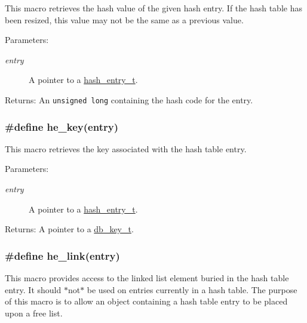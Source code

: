 This macro retrieves the hash value of the given hash entry. If the hash table has been resized, this value may not be the same as a previous value.

\begin{Desc}
\item[Parameters:]
\begin{description}
\item[{\em entry}]A pointer to a \hyperlink{group__dbprim__hash_a1}{hash\_\-entry\_\-t}.\end{description}
\end{Desc}
\begin{Desc}
\item[Returns:]An {\tt unsigned long} containing the hash code for the entry. \end{Desc}
\hypertarget{group__dbprim__hash_a35}{
\subsubsection[he\_\-key]{\setlength{\rightskip}{0pt plus 5cm}\#define he\_\-key(entry)}}
\label{group__dbprim__hash_a35}


This macro retrieves the key associated with the hash table entry.

\begin{Desc}
\item[Parameters:]
\begin{description}
\item[{\em entry}]A pointer to a \hyperlink{group__dbprim__hash_a1}{hash\_\-entry\_\-t}.\end{description}
\end{Desc}
\begin{Desc}
\item[Returns:]A pointer to a \hyperlink{group__dbprim_a0}{db\_\-key\_\-t}. \end{Desc}
\hypertarget{group__dbprim__hash_a31}{
\subsubsection[he\_\-link]{\setlength{\rightskip}{0pt plus 5cm}\#define he\_\-link(entry)}}
\label{group__dbprim__hash_a31}


This macro provides access to the linked list element buried in the hash table entry. It should $\ast$not$\ast$ be used on entries currently in a hash table. The purpose of this macro is to allow an object containing a hash table entry to be placed upon a free list.

